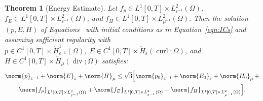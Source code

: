 \documentclass{amsart}
\theoremstyle{thmstyleone}%
\newtheorem{theorem}{Theorem}%
\theoremstyle{thmstyletwo}%
\theoremstyle{thmstylethree}%
\DeclareMathOperator{\curl}{curl}
\def\divgn{\operatorname{div}}
\begin{document}
\begin{theorem}[Energy Estimate] \label{thm:smth_enrgy_estmt}
  Let $f_p \in L^1[0, T] \times L_{\varepsilon^{-1}}^2(\Omega)$, $f_E \in L^1[0, T] \times L^2_{\varepsilon^{-1}}(\Omega)$, and $f_H \in L^1[0, T] \times L^2_{\mu^{-1}}(\Omega)$. Then the solution $(p, E, H)$ of Equations~ with initial conditions as in Equation~\eqref{eqn:ICs} and assuming sufficient regularity with $p \in C^1[0, T] \times \mathring{H}^1_{\varepsilon^{-1}}(\Omega), \; E \in C^1[0, T] \times \mathring{H}_{\varepsilon}(\curl; \Omega)$, and $H \in C^1[0, T] \times \mathring{H}_{\mu}(\divgn; \Omega)$ satisfies:
  \begin{multline*}
    \norm{p}_{\varepsilon^{-1}} + \norm{E}_{\varepsilon} + \norm{H}_{\mu} \le \sqrt{3} \Big[ \norm{p_0}_{\varepsilon^{-1}} + \norm{E_0}_{\varepsilon} + \norm{H_0}_{\mu} \, + \\
    \norm{f_p}_{L^1[0, T] \times L^2_{\varepsilon^{-1}}(\Omega)} + \norm{f_E}_{L^1[0, T] \times L^2_{\varepsilon^{-1}}(\Omega)} + \norm{f_H}_{L^1[0, T] \times L^2_{\mu^{-1}}(\Omega)} \Big].
  \end{multline*}
\end{theorem}
\end{document}
